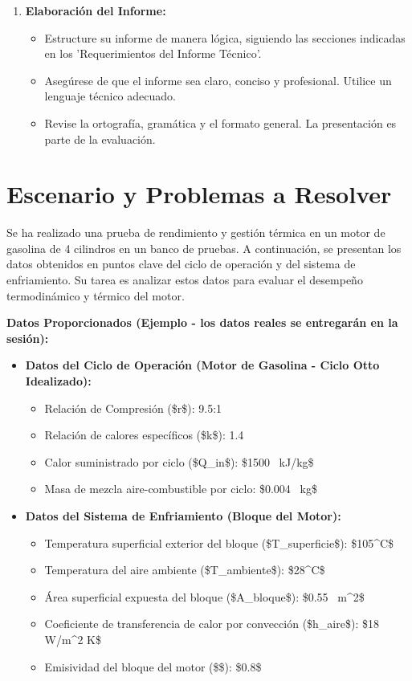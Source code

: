 \documentclass{article}
\begin{document}
\begin{enumerate}
\begin{itemize}
    \end{itemize}
    \item \textbf{Elaboración del Informe:}
    \begin{itemize}
        \item Estructure su informe de manera lógica, siguiendo las secciones indicadas en los 'Requerimientos del Informe Técnico'.
        \item Asegúrese de que el informe sea claro, conciso y profesional. Utilice un lenguaje técnico adecuado.
        \item Revise la ortografía, gramática y el formato general. La presentación es parte de la evaluación.
    \end{itemize}
\end{enumerate}

\section*{Escenario y Problemas a Resolver}

Se ha realizado una prueba de rendimiento y gestión térmica en un motor de gasolina de 4 cilindros en un banco de pruebas. A continuación, se presentan los datos obtenidos en puntos clave del ciclo de operación y del sistema de enfriamiento. Su tarea es analizar estos datos para evaluar el desempeño termodinámico y térmico del motor.

\textbf{Datos Proporcionados (Ejemplo - los datos reales se entregarán en la sesión):}

\begin{itemize}
    \item \textbf{Datos del Ciclo de Operación (Motor de Gasolina - Ciclo Otto Idealizado):}
    \begin{itemize}
        \item Relación de Compresión (\$r\$): 9.5:1
        \item Relación de calores específicos (\$k\$): 1.4
        \item Calor suministrado por ciclo (\$Q_{in}\$): \$1500 \, kJ/kg\$
        \item Masa de mezcla aire-combustible por ciclo: \$0.004 \, kg\$
    \end{itemize}
    \item \textbf{Datos del Sistema de Enfriamiento (Bloque del Motor):}
    \begin{itemize}
        \item Temperatura superficial exterior del bloque (\$T_{superficie}\$): \$105^\circ C\$
        \item Temperatura del aire ambiente (\$T_{ambiente}\$): \$28^\circ C\$
        \item Área superficial expuesta del bloque (\$A_{bloque}\$): \$0.55 \, m^2\$
        \item Coeficiente de transferencia de calor por convección (\$h_{aire}\$): \$18 \, W/m^2 \cdot K\$
        \item Emisividad del bloque del motor (\$\epsilon\$): \$0.8\$
    \end{itemize}
\end{itemize}
\end{document}
